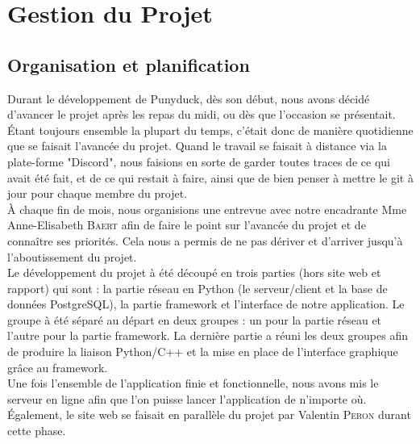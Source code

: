 \documentclass[twoside]{report}
\begin{document}
\chapter{Gestion du Projet}
\section{Organisation et planification}
Durant le développement de Punyduck, dès son début, nous avons décidé d'avancer le projet après les repas du midi,
ou dès que l'occasion se présentait. Étant toujours ensemble la plupart du temps, c'était donc de manière quotidienne que se faisait l'avancée du projet. Quand le travail se faisait à distance via la plate-forme "Discord", nous faisions en sorte de garder toutes traces de ce qui avait été fait, et de ce qui restait à faire, ainsi que de bien penser à mettre le git à jour pour chaque membre du projet.\\

À chaque fin de mois, nous organisions une entrevue avec notre encadrante Mme Anne-Elisabeth \textsc{Baert} afin de faire le point sur l'avancée du projet et de connaître ses priorités. Cela nous a permis de ne pas dériver et d'arriver jusqu'à l'aboutissement du projet. \\

Le développement du projet à été découpé en trois parties (hors site web et rapport) qui sont : la partie réseau en Python (le serveur/client et la base de données PostgreSQL), la partie framework et l'interface de notre application. Le groupe à été séparé au départ en deux groupes : un pour la partie réseau et l'autre pour la partie framework. La dernière partie a réuni les deux groupes afin de produire la liaison Python/C++ et la mise en place de l'interface graphique grâce au framework. \\

Une fois l'ensemble de l'application finie et fonctionnelle, nous avons mis le serveur en ligne afin que l'on puisse lancer l'application de n'importe où. \\
Également, le site web se faisait en parallèle du projet par Valentin \textsc{Peron} durant cette phase.\\

\newpage
\end{document}
